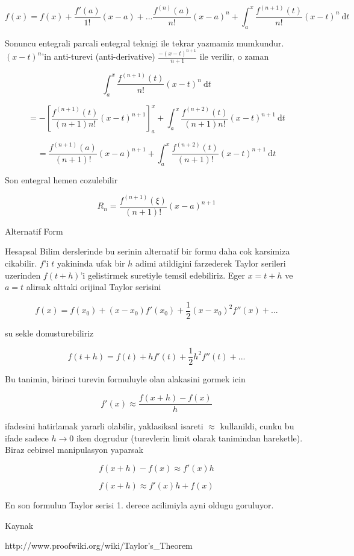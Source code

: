 \documentclass[12pt,fleqn]{article}
\begin{document}
\[ f(x) = f(x) + \frac{f'(a)}{1!}(x - a) + ... 
\frac{f^{(n)}(a)}{n!}(x - a)^n + 
\int_a^x \frac{f^{(n+1)} (t)}{n!} (x - t)^n \ \mathrm d t
\]

Sonuncu entegrali parcali entegral teknigi ile tekrar yazmamiz
mumkundur. $(x-t)^n$'in anti-turevi (anti-derivative)
$\frac{-(x-t)^{n+1}}{n+1}$ ile verilir, o zaman

\[  \int_a^x \frac{f^{(n+1)} \left({t}\right)}{n!} \left({x - t}\right)^n \ 
\mathrm d t\]

\[ =  - \left[ \frac{f^{(n+1)} \left({t}\right)}{(n+1)n!} \left({x - t}\right)^{n+1} \right]_a^x + \int_a^x \frac{f^{(n+2)} \left({t}\right)}{(n+1)n!} \left({x - t}\right)^{n+1} \ \mathrm d t \]

\[ = \frac{f^{(n+1)} (a)}{(n+1)!} (x - a)^{n+1} + \int_a^x \frac{f^{(n+2)} \left({t}\right)} {(n+1)!} \left({x - t}\right)^{n+1} \ \mathrm d t \]

Son entegral hemen cozulebilir

\[ R_n = \frac{f^{(n+1)}(\xi)}{(n+1)!} (x-a)^{n+1} \]

Alternatif Form

Hesapsal Bilim derslerinde bu serinin alternatif bir formu daha cok
karsimiza cikabilir. $f$'i $t$ yakininda ufak bir $h$ adimi atildigini
farzederek Taylor serileri uzerinden $f(t+h)$'i gelistirmek suretiyle
temsil edebiliriz. Eger $x = t+h$ ve $a = t$ alirsak alttaki orijinal
Taylor serisini

\[ f(x) = f (x_0)+(x-x_0) f'(x_0) + \frac1 2 (x-x_0)^2f''(x) + ...\]

su sekle donusturebiliriz

\[ f(t+h) = f (t)+h f'(t) + \frac 1 2 h^2 f''(t) + ...\]

Bu tanimin, birinci turevin formuluyle olan alakasini gormek icin

\[ f'(x) \approx \frac {f(x+h) - f(x)}{h} \]

ifadesini hatirlamak yararli olabilir, yaklasiksal isareti $\approx$
kullanildi, cunku bu ifade sadece $h \to 0$ iken dogrudur (turevlerin limit
olarak tanimindan hareketle). Biraz cebirsel manipulasyon yaparsak

\[ f(x+h) - f(x) \approx f'(x)h  \]

\[ f(x+h)  \approx f'(x)h + f(x) \]

En son formulun Taylor serisi 1. derece acilimiyla ayni oldugu goruluyor. 

Kaynak

http://www.proofwiki.org/wiki/Taylor's\_Theorem
\end{document}
